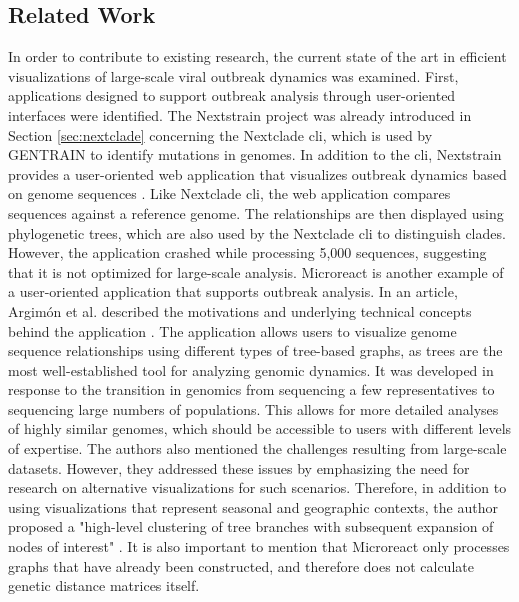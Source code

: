 \subsection{Related Work}
\label{cha:related_work}
In order to contribute to existing research, the current state of the art in efficient visualizations of large-scale viral outbreak dynamics was examined. 
First, applications designed to support outbreak analysis through user-oriented interfaces were identified. The Nextstrain project was already introduced in Section \ref{sec:nextclade} concerning the Nextclade \acrshort{cli}, which is used by GENTRAIN to identify mutations in genomes. In addition to the \acrshort{cli}, Nextstrain provides a user-oriented web application that visualizes outbreak dynamics based on genome sequences \cite{Nex9}. Like Nextclade \acrshort{cli}, the web application compares sequences against a reference genome. The relationships are then displayed using phylogenetic trees, which are also used by the Nextclade \acrshort{cli} to distinguish clades. However, the application crashed while processing 5,000 sequences, suggesting that it is not optimized for large-scale analysis. Microreact is another example of a user-oriented application that supports outbreak analysis. In an article, Argimón et al. described the motivations and underlying technical concepts behind the application \cite{Mic1}. The application allows users to visualize genome sequence relationships using different types of tree-based graphs, as trees are the most well-established tool for analyzing genomic dynamics. It was developed in response to the transition in genomics from sequencing a few representatives to sequencing large numbers of populations. This allows for more detailed analyses of highly similar genomes, which should be accessible to users with different levels of expertise. 
The authors also mentioned the challenges resulting from large-scale datasets. However, they addressed these issues by emphasizing the need for research on alternative visualizations for such scenarios. Therefore, in addition to using visualizations that represent seasonal and geographic contexts, the author proposed a "high-level clustering of tree branches with subsequent expansion of nodes of interest" \cite{Mic1}. It is also important to mention that Microreact only processes graphs that have already been constructed, and therefore does not calculate genetic distance matrices itself.

